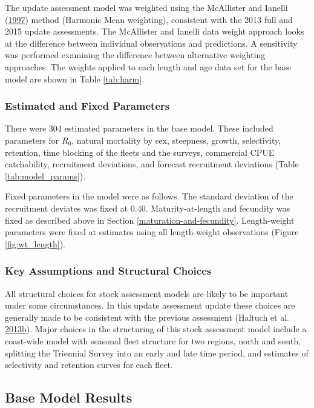 \documentclass[12pt,]{article}
\begin{document}
The update assessment model was weighted using the McAllister and
Ianelli (\protect\hyperlink{ref-mcallister_bayesian_1997}{1997}) method
(Harmonic Mean weighting), consistent with the 2013 full and 2015 update
assessments. The McAllister and Ianelli data weight approach looks at
the difference between individual observations and predictions. A
sensitivity was performed examining the difference between alternative
weighting approaches. The weights applied to each length and age data
set for the base model are shown in Table \ref{tab:harm}.

\subsubsection{Estimated and Fixed
Parameters}\label{estimated-and-fixed-parameters}

There were 304 estimated parameters in the base model. These included
parameters for \(R_0\), natural mortality by sex, steepness, growth,
selectivity, retention, time blocking of the fleets and the surveys,
commercial CPUE catchability, recruitment deviations, and forecast
recruitment deviations (Table \ref{tab:model_params}).

Fixed parameters in the model were as follows. The standard deviation of
the recruitment deviates was fixed at 0.40. Maturity-at-length and
fecundity was fixed as described above in Section
\ref{maturation-and-fecundity}. Length-weight parameters were fixed at
estimates using all length-weight observations (Figure
\ref{fig:wt_length}).

\subsubsection{Key Assumptions and Structural
Choices}\label{key-assumptions-and-structural-choices}

All structural choices for stock assessment models are likely to be
important under some circumstances. In this update assessment update
these choices are generally made to be consistent with the previous
assessment (Haltuch et al.
\protect\hyperlink{ref-haltuch_status_2013}{2013}\protect\hyperlink{ref-haltuch_status_2013}{b}).
Major choices in the structuring of this stock assessment model include
a coast-wide model with seasonal fleet structure for two regions, north
and south, splitting the Triennial Survey into an early and late time
period, and estimates of selectivity and retention curves for each
fleet.

\subsection{Base Model Results}\label{base-model-results}
\end{document}
